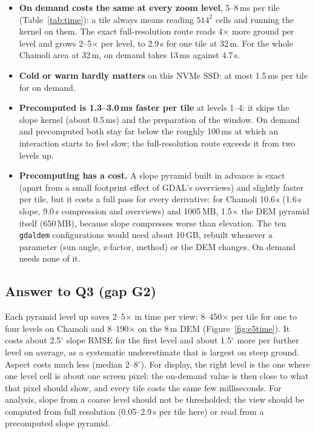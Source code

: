\documentclass[11pt,a4paper]{article}
\begin{document}
\begin{itemize}
  \item \textbf{On demand costs the same at every zoom level}, 5--8\,ms per tile (Table~\ref{tab:time}): a tile
  always means reading $514^2$ cells and running the kernel on them. The exact full-resolution route reads 4$\times$
  more ground per level and grows 2--5$\times$ per level, to 2.9\,s for one tile at 32\,m. For the whole Chamoli area
  at 32\,m, on demand takes 13\,ms against 4.7\,s.
  \item \textbf{Cold or warm hardly matters} on this NVMe SSD: at most 1.5\,ms per tile for on demand.
  \item \textbf{Precomputed is 1.3--3.0\,ms faster per tile} at levels 1--4: it skips the slope kernel (about
  0.5\,ms) and the preparation of the window. On demand and precomputed both stay far below the roughly 100\,ms at
  which an interaction starts to feel slow; the full-resolution route exceeds it from two levels up.
  \item \textbf{Precomputing has a cost.} A slope pyramid built in advance is exact (apart from a small footprint
  effect of GDAL's overviews) and slightly faster per tile, but it costs a full pass for every derivative: for Chamoli 10.6\,s (1.6\,s slope, 9.0\,s compression and
  overviews) and 1005\,MB, 1.5$\times$ the DEM pyramid itself (650\,MB), because slope compresses worse than
  elevation. The ten \texttt{gdaldem} configurations would need about 10\,GB, rebuilt whenever a parameter (sun
  angle, z-factor, method) or the DEM changes. On demand needs none of it.
\end{itemize}

\subsection{Answer to Q3 (gap G2)}
Each pyramid level up saves 2--5$\times$ in time per view: 8--450$\times$ per tile for one to four levels on
Chamoli and 8--190$\times$ on the 8\,m DEM (Figure~\ref{fig:e5time}). It costs about 2.5$^\circ$ slope RMSE for the
first level and about 1.5$^\circ$ more per further level on average, as a systematic underestimate that is largest
on steep ground. Aspect costs much less (median 2--8$^\circ$). For display, the right level is the one where one
level cell is about one screen pixel: the on-demand value is then close to what that pixel should show, and every
tile costs the same few milliseconds. For analysis, slope from a coarse level should not be thresholded; the view
should be computed from full resolution (0.05--2.9\,s per tile here) or read from a precomputed slope pyramid.
\end{document}
